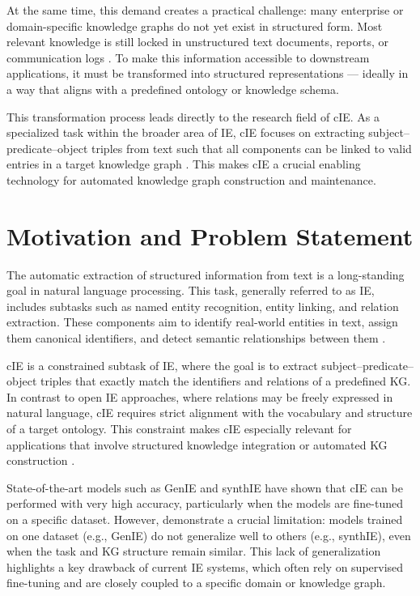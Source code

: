 \documentclass[a4paper,oneside,bibliography=totoc]{scrbook}
\begin{document}
At the same time, this demand creates a practical challenge: many enterprise or domain-specific knowledge graphs do not yet exist in structured form. Most relevant knowledge is still locked in unstructured text documents, reports, or communication logs \cite{Korolov2025}. To make this information accessible to downstream applications, it must be transformed into structured representations — ideally in a way that aligns with a predefined ontology or knowledge schema.

This transformation process leads directly to the research field of \ac{cIE}. As a specialized task within the broader area of \ac{IE}, \ac{cIE} focuses on extracting subject–predicate–object triples from text such that all components can be linked to valid entries in a target knowledge graph \cite{Josifoski2021}. This makes \ac{cIE} a crucial enabling technology for automated knowledge graph construction and maintenance.

\section{Motivation and Problem Statement}
\label{sec:motivation}

The automatic extraction of structured information from text is a long-standing goal in natural language processing. This task, generally referred to as \ac{IE}, includes subtasks such as named entity recognition, entity linking, and relation extraction. These components aim to identify real-world entities in text, assign them canonical identifiers, and detect semantic relationships between them \cite{Zhao2024}.

\ac{cIE} is a constrained subtask of \ac{IE}, where the goal is to extract subject–predicate–object triples that exactly match the identifiers and relations of a predefined \ac{KG}. In contrast to open \ac{IE} approaches, where relations may be freely expressed in natural language, \ac{cIE} requires strict alignment with the vocabulary and structure of a target ontology. This constraint makes \ac{cIE} especially relevant for applications that involve structured knowledge integration or automated \ac{KG} construction \cite{Josifoski2021}.

State-of-the-art models such as GenIE and synthIE have shown that \ac{cIE} can be performed with very high accuracy, particularly when the models are fine-tuned on a specific dataset. However, \cite{Josifoski2021,Josifoski2023} demonstrate a crucial limitation: models trained on one dataset (e.g., GenIE) do not generalize well to others (e.g., synthIE), even when the task and \ac{KG} structure remain similar. This lack of generalization highlights a key drawback of current \ac{IE} systems, which often rely on supervised fine-tuning and are closely coupled to a specific domain or knowledge graph.
\end{document}
